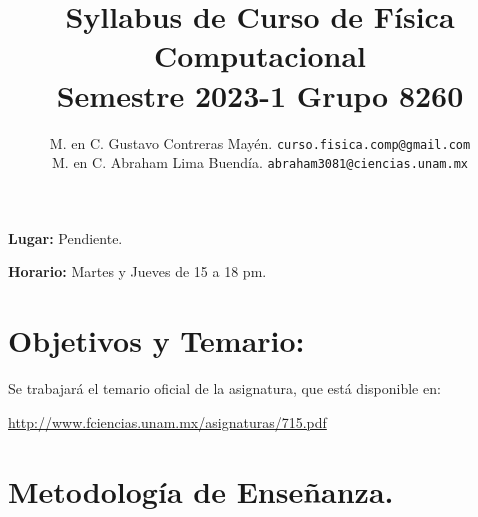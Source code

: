 

\author{M. en C. Gustavo Contreras Mayén. \texttt{curso.fisica.comp@gmail.com}\\
M. en C. Abraham Lima Buendía. \texttt{abraham3081@ciencias.unam.mx}}
\title{Syllabus de Curso de Física Computacional \\ {\large Semestre 2023-1 Grupo 8260}}
\date{ }
\makeatletter
\renewcommand{\@biblabel}[1]{}
\renewenvironment{thebibliography}[1]
     {\section*{\refname}%
      \@mkboth{\MakeUppercase\refname}{\MakeUppercase\refname}%
      \list{}%
           {\labelwidth=0pt
            \labelsep=0pt
            \leftmargin1.5em
            \itemindent=-1.5em
            \advance\leftmargin\labelsep
            \@openbib@code
            }%
      \sloppy
      \clubpenalty4000
      \@clubpenalty \clubpenalty
      \widowpenalty4000%
      \sfcode`\.\@m}
\makeatother



\renewcommand\labelenumii{\theenumi.{\arabic{enumii}}}
\maketitle
\fontsize{12}{12}\selectfont

\textbf{Lugar: } Pendiente.
\par
\textbf{Horario: } Martes y Jueves de 15 a 18 pm.
\par
\par
\section{Objetivos y Temario:}

Se trabajará el temario oficial de la asignatura, que está disponible en:

\href{http://www.fciencias.unam.mx/asignaturas/715.pdf}{http://www.fciencias.unam.mx/asignaturas/715.pdf}

\section{Metodología de Enseñanza.}

